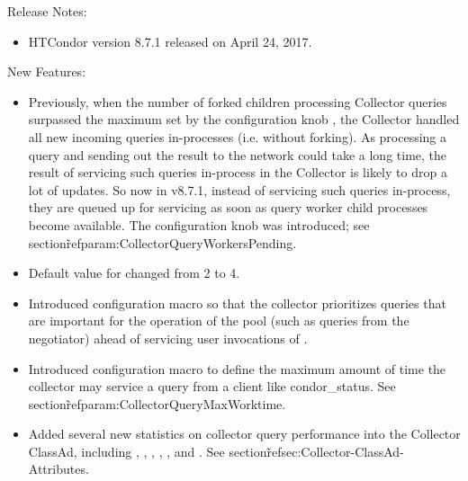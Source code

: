 \noindent Release Notes:

\begin{itemize}

\item HTCondor version 8.7.1 released on April 24, 2017.

\end{itemize}


\noindent New Features:

\begin{itemize}

\item Previously, when the number of forked children processing Collector
queries surpassed the maximum set by the configuration knob , the
Collector handled all new incoming queries in-processes (i.e. without
forking). As processing a query and sending out the result to the network
could take a long time, the result of servicing such queries in-process in
the Collector is likely to drop a lot of updates. So now in v8.7.1, instead of
servicing such queries in-process, they are queued up for servicing as soon as
query worker child processes become available.  The configuration knob
 was introduced; see
section\~ref{param:CollectorQueryWorkersPending}.

\item Default value for  changed from 2 to 4.

\item Introduced configuration macro
 so that the
collector prioritizes queries that are important for the operation of the
pool (such as queries from the negotiator) ahead of servicing user
invocations of .

\item Introduced configuration macro  to
define the maximum amount of time the collector may service a query from a
client like condor\_status.  See section\~ref{param:CollectorQueryMaxWorktime}.

\item Added several new statistics on collector query performance into the Collector
ClassAd, including , ,
, , ,
and .  See section\~ref{sec:Collector-ClassAd-Attributes}.


\end{itemize}
